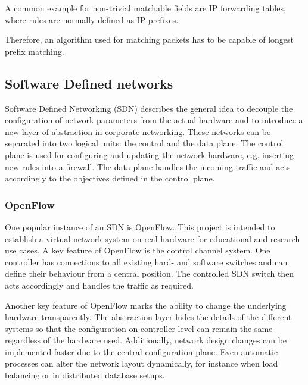 \documentclass[a4paper,
		12pt,
		parskip=full,
		titlepage
		]{scrartcl}
\begin{document}
A common example for non-trivial matchable fields are IP forwarding tables, where rules are normally defined as IP prefixes.


Therefore, an algorithm used for matching packets has to be capable of longest prefix matching.


\subsection{Software Defined networks}
\label{sec:SDN}
Software Defined Networking (SDN) describes the general idea to decouple 
the configuration of network parameters from the actual hardware and to 
introduce a new layer of abstraction in corporate networking\cite{onf_whitepaper}.
These networks can be separated into two logical units: the control and the data plane.
The control plane is used for configuring and updating the network hardware, e.g. inserting new rules into a firewall.
The data plane handles the incoming traffic and acts accordingly to the objectives defined in the control plane.

\subsubsection{OpenFlow}
One popular instance of an SDN is OpenFlow.
This project is intended to establish a virtual network system on real hardware for educational and research use cases.
A key feature of OpenFlow is the control channel system.
One controller has connections to all existing hard- and software switches and can define their behaviour from a central position.
The controlled SDN switch then acts accordingly and handles the traffic as required.

Another key feature of OpenFlow marks the ability to change the underlying hardware transparently.
The abstraction layer hides the details of the different systems so that 
the configuration on controller level can remain the same regardless of the hardware used.
Additionally, network design changes can be implemented faster due to the central configuration plane.
Even automatic processes can alter the network layout dynamically, for instance when load balancing 
or in distributed database setups.
\end{document}
